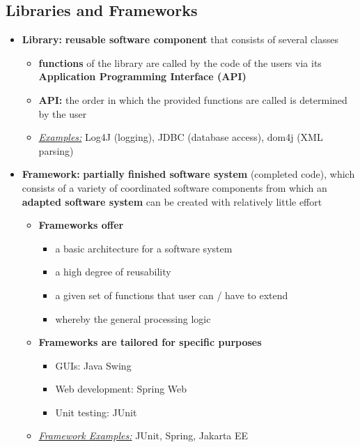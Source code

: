 \documentclass[ieeetran]{article}
\begin{document}
\subsection{Libraries and Frameworks} %
\label{sub:libraries_an}
\begin{itemize}
  \item \textbf{Library:} \textbf{reusable software component} that consists of several classes
	  \begin{itemize}
		  \item \textbf{functions} of the library are called by the code of the users via its \textbf{Application Programming Interface (API)}
		\item \textbf{API:} the order in which the provided functions are called is determined by the user
		\item \textit{\underline{Examples:}} Log4J (logging), JDBC (database access), dom4j (XML parsing)
	  \end{itemize}

\item \textbf{Framework:} \textbf{partially finished software system} (completed code), which consists of a variety of coordinated software components from which an \textbf{adapted software system} can be created with relatively little effort
	\begin{itemize}
		\item \textbf{Frameworks offer}
			\begin{itemize}
			  \item a basic architecture for a software system
				  \item a high degree of reusability
					\item a given set of functions that user can / have to extend
						\item whereby the general processing logic

			\end{itemize}
\item \textbf{Frameworks are tailored for specific purposes}
	\begin{itemize}
	  \item GUIs: Java Swing
	\item Web development: Spring Web
	\item Unit testing: JUnit
	\end{itemize}

\item \textit{\underline{Framework Examples:}} JUnit, Spring, Jakarta EE 
	\end{itemize}


\end{itemize}
\end{document}
